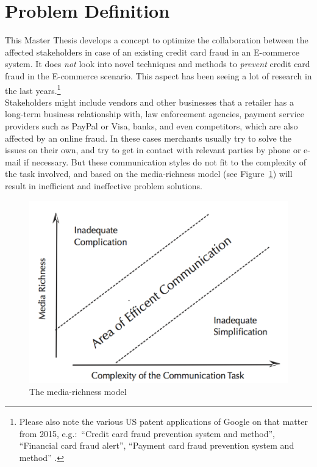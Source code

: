 
\section{Problem Definition}
\label{sec:problem_definition}

This Master Thesis develops a concept to optimize the collaboration between the affected stakeholders in case of an existing credit card fraud in an \gls{E-commerce} system. It does \emph{not} look into novel techniques and methods to \emph{prevent} credit card fraud in the \gls{E-commerce} scenario. This aspect has been seeing a lot of research in the last years.\footnote{Please also note the various US patent applications of Google on that matter from 2015, e.g.:\ “Credit card fraud prevention system and method”, “Financial card fraud alert”, “Payment card fraud prevention system and method” \citep{GooglePatents2015}.} \\

Stakeholders might include vendors and other businesses that a retailer has a long-term business relationship with, law enforcement agencies, payment service providers such as PayPal or Visa, banks, and even competitors, which are also affected by an online fraud. In these cases merchants usually try to solve the issues on their own, and try to get in contact with relevant parties by phone or e-mail if necessary. But these communication styles do not fit to the complexity of the task involved, and based on the media-richness model (see Figure~\ref{fig:images_media_richness_model}) will result in inefficient and ineffective problem solutions. \\

\begin{figure}[!ht]
	\centering
		\includegraphics[width=0.9\columnwidth]{images/media-richness-model.png}
	\caption[The media-richness model]{The media-richness model \citep{Rice1992}}
\label{fig:images_media_richness_model}
\end{figure}

